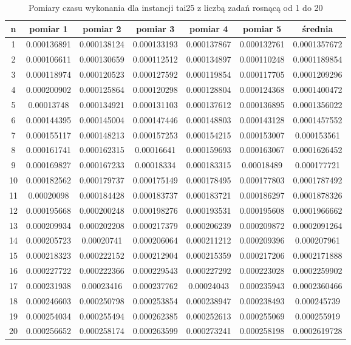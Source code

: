 \documentclass[a4paper,11pt]{article}
\begin{document}
\begin{table}
\begin{center}
\begin{tabular}{ | c | c | c | c | c | c | c | }
\hline
n & pomiar 1 & pomiar 2 & pomiar 3 & pomiar 4 & pomiar 5 & średnia \\ \hline
1 & 0.000136891 & 0.000138124 & 0.000133193 & 0.000137867 & 0.000132761 & 0.0001357672 \\ \hline
2 & 0.000106611 & 0.000130659 & 0.000112512 & 0.000134897 & 0.000110248 & 0.0001189854 \\ \hline
3 & 0.000118974 & 0.000120523 & 0.000127592 & 0.000119854 & 0.000117705 & 0.0001209296 \\ \hline
4 & 0.000200902 & 0.000125864 & 0.000120298 & 0.000128804 & 0.000124368 & 0.0001400472 \\ \hline
5 & 0.00013748 & 0.000134921 & 0.000131103 & 0.000137612 & 0.000136895 & 0.0001356022 \\ \hline
6 & 0.000144395 & 0.000145004 & 0.000147446 & 0.000148803 & 0.000143128 & 0.0001457552 \\ \hline
7 & 0.000155117 & 0.000148213 & 0.000157253 & 0.000154215 & 0.000153007 & 0.000153561 \\ \hline
8 & 0.000161741 & 0.000162315 & 0.00016641 & 0.000159693 & 0.000163067 & 0.0001626452 \\ \hline
9 & 0.000169827 & 0.000167233 & 0.00018334 & 0.000183315 & 0.00018489 & 0.000177721 \\ \hline
10 & 0.000182562 & 0.000179737 & 0.000175149 & 0.000178495 & 0.000177803 & 0.0001787492 \\ \hline
11 & 0.00020098 & 0.000184428 & 0.000183737 & 0.000183721 & 0.000186297 & 0.0001878326 \\ \hline
12 & 0.000195668 & 0.000200248 & 0.000198276 & 0.000193531 & 0.000195608 & 0.0001966662 \\ \hline
13 & 0.000209934 & 0.000202208 & 0.000217379 & 0.000206239 & 0.000209872 & 0.0002091264 \\ \hline
14 & 0.000205723 & 0.00020741 & 0.000206064 & 0.000211212 & 0.000209396 & 0.000207961 \\ \hline
15 & 0.000218323 & 0.000222152 & 0.000212904 & 0.000215359 & 0.000217206 & 0.0002171888 \\ \hline
16 & 0.000227722 & 0.000222366 & 0.000229543 & 0.000227292 & 0.000223028 & 0.0002259902 \\ \hline
17 & 0.000231938 & 0.00023416 & 0.000237762 & 0.00024043 & 0.000235943 & 0.0002360466 \\ \hline
18 & 0.000246603 & 0.000250798 & 0.000253854 & 0.000238947 & 0.000238493 & 0.000245739 \\ \hline
19 & 0.000254034 & 0.000255494 & 0.000262385 & 0.000252613 & 0.000255069 & 0.000255919 \\ \hline
20 & 0.000256652 & 0.000258174 & 0.000263599 & 0.000273241 & 0.000258198 & 0.0002619728 \\ \hline
\end{tabular}
\caption{Pomiary czasu wykonania dla instancji tai25 z liczbą zadań rosnącą od 1 do 20}
\end{center}
\end{table}
\end{document}
